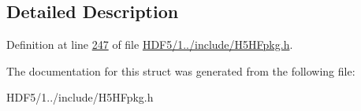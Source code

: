 \subsection{Detailed Description}


Definition at line \hyperlink{_h_d_f5_21_810_81_2include_2_h5_h_fpkg_8h_source_l00247}{247} of file \hyperlink{_h_d_f5_21_810_81_2include_2_h5_h_fpkg_8h_source}{H\+D\+F5/1../include/\+H5\+H\+Fpkg.\+h}.



The documentation for this struct was generated from the following file\+:\begin{DoxyCompactItemize}
\item 
H\+D\+F5/1../include/\+H5\+H\+Fpkg.\+h\end{DoxyCompactItemize}

